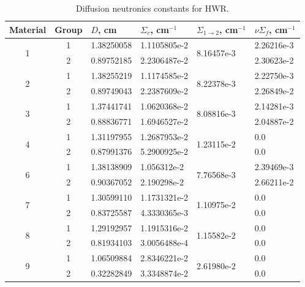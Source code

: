 \documentclass[authoryear]{elsarticle}
\begin{document}
\begin{table}[h]
\caption{Diffusion neutronics constants for HWR.}
\label{tab:hwr}
\begin{center}
\begin{tabular}{ccllll}
\hline
Material & Group & $D$, cm & $\Sigma_r$, cm$^{-1}$ & $\Sigma_{1\to 2}$, cm$^{-1}$ & $\nu\Sigma_f$, cm$^{-1}$\\
\hline
\multirow{ 2}{*}{1} & 1 & 1.38250058 & 1.1105805e-2 & \multirow{ 2}{*}{8.16457e-3} & 2.26216e-3 \\
  & 2 & 0.89752185 & 2.2306487e-2 &            & 2.30623e-2 \\
\hline
\multirow{ 2}{*}{2} & 1 & 1.38255219 & 1.1174585e-2 & \multirow{ 2}{*}{8.22378e-3} & 2.22750e-3 \\
  & 2 & 0.89749043 & 2.2387609e-2 &            & 2.26849e-2 \\
\hline
\multirow{ 2}{*}{3} & 1 & 1.37441741 & 1.0620368e-2 & \multirow{ 2}{*}{8.08816e-3} & 2.14281e-3 \\
  & 2 & 0.88836771 & 1.6946527e-2 &            & 2.04887e-2 \\
\hline
\multirow{ 2}{*}{4} & 1 & 1.31197955 & 1.2687953e-2 & \multirow{ 2}{*}{1.23115e-2} & 0.0 \\
  & 2 & 0.87991376 & 5.2900925e-2 &            & 0.0 \\
\hline
\multirow{ 2}{*}{6} & 1 & 1.38138909 & 1.056312e-2 & \multirow{ 2}{*}{7.76568e-3} & 2.39469e-3 \\
  & 2 & 0.90367052 & 2.190298e-2 &            & 2.66211e-2 \\
\hline
\multirow{ 2}{*}{7} & 1 & 1.30599110 & 1.1731321e-2 & \multirow{ 2}{*}{1.10975e-2} & 0.0 \\
  & 2 & 0.83725587 & 4.3330365e-3 &            & 0.0 \\
\hline
\multirow{ 2}{*}{8} & 1 & 1.29192957 & 1.1915316e-2 & \multirow{ 2}{*}{1.15582e-2} & 0.0 \\
  & 2 & 0.81934103 & 3.0056488e-4 &            & 0.0 \\
\hline
\multirow{ 2}{*}{9} & 1 & 1.06509884 & 2.8346221e-2 & \multirow{ 2}{*}{2.61980e-2} & 0.0 \\
  & 2 & 0.32282849 & 3.3348874e-2 &            & 0.0 \\  
\hline
\end{tabular}
\end{center}
\end{table}
\end{document}
